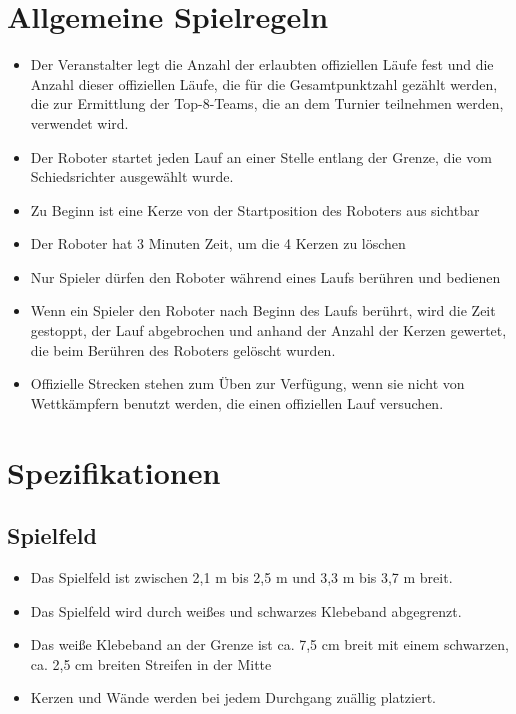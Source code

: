 \documentclass[a4paper,12pt]{article}
\begin{document}
\section{Allgemeine Spielregeln}
\begin{itemize}
	\item Der Veranstalter legt die Anzahl der erlaubten offiziellen Läufe fest und die Anzahl dieser offiziellen Läufe, die für die Gesamtpunktzahl gezählt werden, die zur Ermittlung der Top-8-Teams, die an dem Turnier teilnehmen werden, verwendet wird.
	\item Der Roboter startet jeden Lauf an einer Stelle entlang der Grenze, die vom Schiedsrichter ausgewählt wurde.
	\item Zu Beginn ist eine Kerze von der Startposition des Roboters aus sichtbar
	\item Der Roboter hat 3 Minuten Zeit, um die 4 Kerzen zu löschen
	\item Nur Spieler dürfen den Roboter während eines Laufs berühren und bedienen
	\item Wenn ein Spieler den Roboter nach Beginn des Laufs berührt, wird die Zeit gestoppt, der Lauf abgebrochen und anhand der  Anzahl der Kerzen gewertet, die beim Berühren des Roboters gelöscht wurden.
	\item Offizielle Strecken stehen zum Üben zur Verfügung, wenn sie nicht von Wettkämpfern benutzt werden, die einen offiziellen Lauf versuchen.
\end{itemize}
\section{Spezifikationen}
\subsection{Spielfeld}
\begin{itemize}
	\item  Das Spielfeld ist zwischen 2,1 m bis 2,5 m und 3,3 m bis 3,7 m breit.
	\item Das Spielfeld wird durch weißes und schwarzes Klebeband abgegrenzt.
	\item Das weiße Klebeband an der Grenze ist ca. 7,5 cm breit mit einem schwarzen, ca. 2,5 cm breiten Streifen in der Mitte
	\item Kerzen und Wände werden bei jedem Durchgang zuällig platziert.
\end{itemize}
\end{document}
